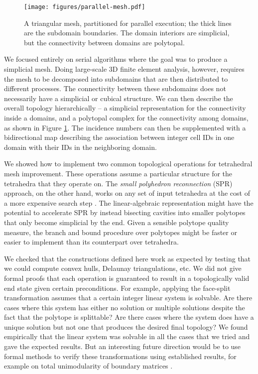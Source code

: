 \documentclass[twocolumn]{article}
\begin{document}
\begin{figure}[t]
    \begin{center}
        \texttt{[image: figures/parallel-mesh.pdf]}
    \end{center}
    \caption{A triangular mesh, partitioned for parallel execution; the thick lines are the subdomain boundaries.
    The domain interiors are simplicial, but the connectivity between domains are polytopal.}
    \label{fig:parallel-mesh}
\end{figure}

We focused entirely on serial algorithms where the goal was to produce a simplicial mesh.
Doing large-scale 3D finite element analysis, however, requires the mesh to be decomposed into subdomains that are then distributed to different processes.
The connectivity between these subdomains does not necessarily have a simplicial or cubical structure.
We can then describe the overall topology hierarchically -- a simplicial representation for the connectivity inside a domains, and a polytopal complex for the connectivity among domains, as shown in Figure \ref{fig:parallel-mesh}.
The incidence numbers can then be supplemented with a bidirectional map describing the association between integer cell IDs in one domain with their IDs in the neighboring domain.

We showed how to implement two common topological operations for tetrahedral mesh improvement.
These operations assume a particular structure for the tetrahedra that they operate on.
The \emph{small polyhedron reconnection} (SPR) approach, on the other hand, works on any set of input tetrahedra at the cost of a more expensive search step \cite{marot2020reviving}.
The linear-algebraic representation might have the potential to accelerate SPR by instead bisecting cavities into smaller polytopes that only become simplicial by the end.
Given a sensible polytope quality measure, the branch and bound procedure over polytopes might be faster or easier to implement than its counterpart over tetrahedra.

We checked that the constructions defined here work as expected by testing that we could compute convex hulls, Delaunay triangulations, etc.
We did not give formal proofs that each operation is guaranteed to result in a topologically valid end state given certain preconditions.
For example, applying the face-split transformation assumes that a certain integer linear system is solvable.
Are there cases where this system has either no solution or multiple solutions despite the fact that the polytope is splittable?
Are there cases where the system does have a unique solution but not one that produces the desired final topology?
We found empirically that the linear system was solvable in all the cases that we tried and gave the expected results.
But an interesting future direction would be to use formal methods to verify these transformations using established results, for example on total unimodularity of boundary matrices \cite{dey2010optimal}.
\end{document}
